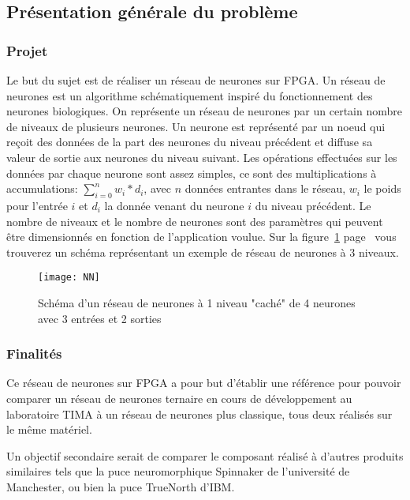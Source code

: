 
\subsection{Présentation générale du problème}

\subsubsection{Projet}
Le but du sujet est de réaliser un réseau de neurones sur FPGA. Un réseau de neurones est un algorithme schématiquement inspiré du fonctionnement des neurones biologiques.
On représente un réseau de neurones par un certain nombre de niveaux de plusieurs neurones.
Un neurone est représenté par un noeud qui reçoit des données de la part des neurones du niveau précédent et diffuse sa valeur de sortie aux neurones du niveau suivant.
Les opérations effectuées sur les données par chaque neurone sont assez simples, ce sont des multiplications à accumulations:  $\sum_{i=0}^n w_{i}*d_{i}$, avec $n$ données
entrantes dans le réseau, $w_{i}$ le poids pour l'entrée $i$ et $d_{i}$ la donnée venant du neurone $i$ du niveau précédent.
Le nombre de niveaux et le nombre de neurones sont des paramètres qui peuvent être dimensionnés en fonction de l'application voulue.
Sur la figure~\ref{fig:NN} page~\pageref{fig:NN} vous trouverez un schéma représentant un exemple de réseau de neurones à 3 niveaux.

\begin{figure}[htbp]
\begin{center}
\texttt{[image: NN]}
\caption{Schéma d'un réseau de neurones à 1 niveau "caché" de 4 neurones avec 3 entrées et 2 sorties}
\label{fig:NN}
\end{center}
\end{figure}

\subsubsection{Finalités}

Ce réseau de neurones sur FPGA a pour but d'établir une référence pour pouvoir
comparer un réseau de neurones ternaire en cours de développement au laboratoire
TIMA à un réseau de neurones plus classique, tous deux réalisés sur le même
matériel.

Un objectif secondaire serait de comparer le composant réalisé à d'autres
produits similaires tels que la puce neuromorphique Spinnaker de l'université
de Manchester, ou bien la puce TrueNorth d'IBM.

